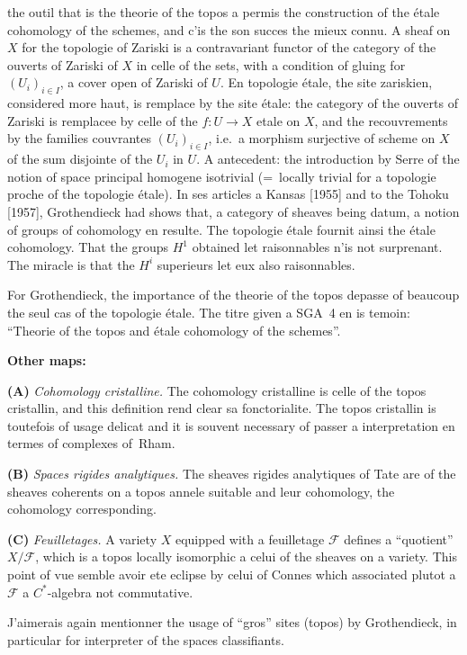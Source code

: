 \documentclass[11pt,a4paper]{article}
\theoremstyle{plain}
\theoremstyle{definition}
\begin{document}
the outil that is the theorie of the topos a permis the construction of the étale cohomology of the schemes, and c'is the son succes the mieux connu. A sheaf on $X$ for the topologie of Zariski is a contravariant functor of the category of the ouverts of Zariski of $X$ in celle of the sets, with a condition of gluing for $(U_i)_{i \in I}$, a cover open of Zariski of $U$. En topologie étale, the site zariskien, considered more haut, is remplace by the site étale: the category of the ouverts of Zariski is remplacee by celle of the $f \colon U \to X$ etale on $X$, and the recouvrements by the families couvrantes $(U_i)_{i \in I}$, i.e.\ a morphism surjective of scheme on $X$ of the sum disjointe of the $U_i$ in $U$. A antecedent: the introduction by Serre of the notion of space principal homogene isotrivial (=~locally trivial for a topologie proche of the topologie étale). In ses articles a Kansas [1955] and to the Tohoku [1957], Grothendieck had shows that, a category of sheaves being datum, a notion of groups of cohomology en resulte. The topologie étale fournit ainsi the étale cohomology. That the groups $H^1$ obtained let raisonnables n'is not surprenant. The miracle is that the $H^i$ superieurs let eux also raisonnables.

For Grothendieck, the importance of the theorie of the topos depasse of beaucoup the seul cas of the topologie étale. The titre given a SGA~4 en is temoin: ``Theorie of the topos and étale cohomology of the schemes''.

\textbf{Other maps:}

\medskip
\textbf{(A)} \emph{Cohomology cristalline.} The cohomology cristalline is celle of the topos cristallin, and this definition rend clear sa fonctorialite. The topos cristallin is toutefois of usage delicat and it is souvent necessary of passer a interpretation en termes of complexes of~Rham.

\textbf{(B)} \emph{Spaces rigides analytiques.} The sheaves rigides analytiques of Tate are of the sheaves coherents on a topos annele suitable and leur cohomology, the cohomology corresponding.

\textbf{(C)} \emph{Feuilletages.} A variety $X$ equipped with a feuilletage $\mathcal{F}$ defines a ``quotient'' $X/\mathcal{F}$, which is a topos locally isomorphic a celui of the sheaves on a variety. This point of vue semble avoir ete eclipse by celui of Connes which associated plutot a $\mathcal{F}$ a $C^*$-algebra not commutative.

J'aimerais again mentionner the usage of ``gros'' sites (topos) by Grothendieck, in particular for interpreter of the spaces classifiants.
\end{document}
